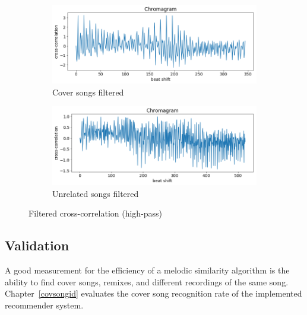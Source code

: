 \begin{figure}[htbp]
{{%
			\begin{subfigure}{.495\textwidth}
				\centering    
				\includegraphics[scale=0.3]{Images/Chroma/beatalignedchroma_corr_mean_filt.png}
				\caption{Cover songs filtered}
				\label{ccf3}
			\end{subfigure}		
			\begin{subfigure}{.495\textwidth}
				\centering     
				\includegraphics[scale=0.3]{Images/Chroma/beatalignedchroma_corr_mean2_filt.png}
				\caption{Unrelated songs filtered}
				\label{ccf4}
			\end{subfigure}%
	}}
	\caption{Filtered cross-correlation (high-pass)}
	\label{fig:crosscorr3}
\end{figure}

\subsection{Validation}\label{chromavalid}
A good measurement for the efficiency of a melodic similarity algorithm is the ability to find cover songs, remixes, and different recordings of the same song. Chapter~\ref{covsongid} evaluates the cover song recognition rate of the implemented recommender system. 
